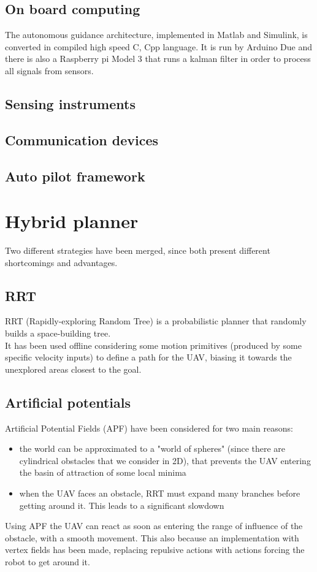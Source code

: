 \documentclass[oneside,onecolumn]{article}
\begin{document}
\subsection{On board computing}
The autonomous guidance architecture, implemented in Matlab and Simulink, is converted in compiled high speed C, Cpp language. It is run by Arduino Due and there is also a Raspberry pi Model 3 that runs a kalman filter in
order to process all signals from sensors.


\subsection{Sensing instruments}

\subsection{Communication devices}
 
\subsection{Auto pilot framework}

\section{Hybrid planner}
Two different strategies have been merged, since both present different shortcomings and advantages.

\subsection{RRT}
RRT (Rapidly-exploring Random Tree) is a probabilistic planner that randomly builds a space-building tree.\\
It has been used offline considering some motion primitives (produced by some specific velocity inputs) to define a path for the UAV, biasing it towards the unexplored areas closest to the goal.
\subsection{Artificial potentials}
Artificial Potential Fields (APF) have been considered for two main reasons:
\begin{itemize}
	\item the world can be approximated to a "world of spheres" (since there are cylindrical obstacles that we consider in 2D), that prevents the UAV entering the basin of attraction of some local minima
	\item when the UAV faces an obstacle, RRT must expand many branches before getting around it. This leads to a significant slowdown
\end{itemize}
Using APF the UAV can react as soon as entering the range of influence of the obstacle, with a smooth movement. This also because an implementation with vertex fields has been made, replacing repulsive actions with actions forcing the robot to get around it.
\end{document}
